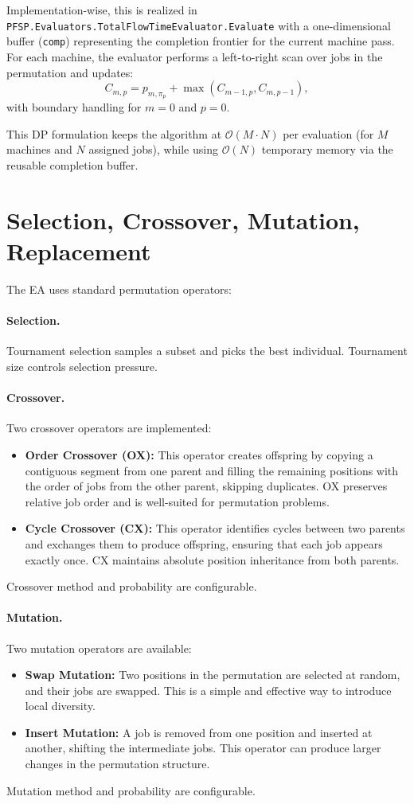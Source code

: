 \documentclass[12pt,a4paper]{report}
\begin{document}
Implementation-wise, this is realized in \texttt{PFSP.Evaluators.TotalFlowTimeEvaluator.Evaluate} with a one-dimensional buffer
(\texttt{comp}) representing the completion frontier for the current machine pass. For each machine, the evaluator performs a left-to-right scan over jobs in the permutation and updates:
\[
C_{m,p} = p_{m,\pi_p} + \max(C_{m-1,p}, C_{m,p-1}),
\]
with boundary handling for \(m=0\) and \(p=0\).

This DP formulation keeps the algorithm at \(\mathcal{O}(M\cdot N)\) per evaluation (for \(M\) machines and \(N\) assigned jobs),
while using \(\mathcal{O}(N)\) temporary memory via the reusable completion buffer.

\section{Selection, Crossover, Mutation, Replacement}
The EA uses standard permutation operators:

\paragraph{Selection.}
Tournament selection samples a subset and picks the best individual. Tournament size controls selection pressure.

\paragraph{Crossover.}
Two crossover operators are implemented:
\begin{itemize}
    \item \textbf{Order Crossover (OX):} This operator creates offspring by copying a contiguous segment from one parent and filling the remaining positions with the order of jobs from the other parent, skipping duplicates. OX preserves relative job order and is well-suited for permutation problems.
    \item \textbf{Cycle Crossover (CX):} This operator identifies cycles between two parents and exchanges them to produce offspring, ensuring that each job appears exactly once. CX maintains absolute position inheritance from both parents.
\end{itemize}
Crossover method and probability are configurable.

\paragraph{Mutation.}
Two mutation operators are available:
\begin{itemize}
    \item \textbf{Swap Mutation:} Two positions in the permutation are selected at random, and their jobs are swapped. This is a simple and effective way to introduce local diversity.
    \item \textbf{Insert Mutation:} A job is removed from one position and inserted at another, shifting the intermediate jobs. This operator can produce larger changes in the permutation structure.
\end{itemize}
Mutation method and probability are configurable.
\end{document}
